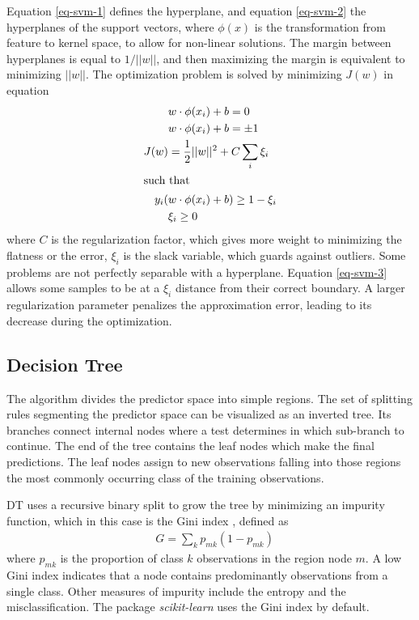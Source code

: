 Equation \ref{eq-svm-1} defines the hyperplane, and equation \ref{eq-svm-2} the hyperplanes of the support vectors, where $\phi(x)$ is the transformation from feature to kernel space, to allow for non-linear solutions.
The margin between hyperplanes is equal to $1/||w||$, and then maximizing the margin is equivalent to minimizing $||w||$.
The optimization problem is solved by minimizing $J(w)$ in equation \label{eq-svm-3}
\begin{align}
&w \cdot \phi(x_i) + b = 0    \label{eq-svm-1} \\
&w \cdot \phi(x_i) + b = \pm1 \label{eq-svm-2} \\
J(w) &= \frac{1}{2} ||w||^2 + C \sum_i \xi_i \label{eq-svm-3} \\
\intertext{such that}
y_i(&w \cdot \phi(x_i) + b) \geq 1-\xi_i \\
& \xi_i \geq 0
\end{align}
where $C$ is the regularization factor, which gives more weight to minimizing the flatness or the error, $\xi_i$ is the slack variable, which guards against outliers.
Some problems are not perfectly separable with a hyperplane.
Equation \ref{eq-svm-3} allows some samples to be at a $\xi_i$ distance from their correct boundary.
A larger regularization parameter penalizes the approximation error, leading to its decrease during the optimization.


\subsection{Decision Tree}


The algorithm divides the predictor space into simple regions.
The set of splitting rules segmenting the predictor space can be visualized as an inverted tree.
Its branches connect internal nodes where a test determines in which sub-branch to continue.
The end of the tree contains the leaf nodes which make the final predictions.
The leaf nodes assign to new observations falling into those regions the most commonly occurring class of the training observations.

\Gls*{DT} uses a recursive binary split to grow the tree by minimizing an impurity function, which in this case is the Gini index \cite{pedregosa_scikit-learn_2011}, defined as
\begin{align}
& G = \sum_k p_{mk}(1-p_{mk}) \label{eq-dt}
\end{align}
where $p_{mk}$ is the proportion of class $k$ observations in the region node $m$.
A low Gini index indicates that a node contains predominantly observations from a single class.
Other measures of impurity include the entropy and the misclassification.
The package \textit{scikit-learn} uses the Gini index by default.

